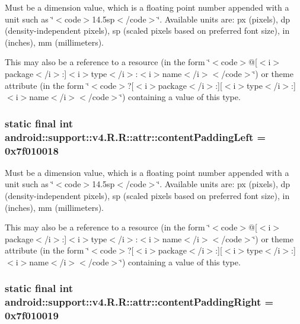 Must be a dimension value, which is a floating point number appended with a unit such as \char`\"{}$<$code$>$14.5sp$<$/code$>$\char`\"{}. Available units are: px (pixels), dp (density-independent pixels), sp (scaled pixels based on preferred font size), in (inches), mm (millimeters). 

This may also be a reference to a resource (in the form \char`\"{}$<$code$>$@\mbox{[}$<$i$>$package$<$/i$>$:\mbox{]}$<$i$>$type$<$/i$>$:$<$i$>$name$<$/i$>$$<$/code$>$\char`\"{}) or theme attribute (in the form \char`\"{}$<$code$>$?\mbox{[}$<$i$>$package$<$/i$>$:\mbox{]}\mbox{[}$<$i$>$type$<$/i$>$:\mbox{]}$<$i$>$name$<$/i$>$$<$/code$>$\char`\"{}) containing a value of this type. \hypertarget{classandroid_1_1support_1_1v4_1_1_r_1_1attr_6cf1c4f10e5e16f428e3e7e74b7709d2}{
\subsubsection[{contentPaddingLeft}]{\setlength{\rightskip}{0pt plus 5cm}static final int android::support::v4.R.R::attr::contentPaddingLeft = 0x7f010018}}
\label{classandroid_1_1support_1_1v4_1_1_r_1_1attr_6cf1c4f10e5e16f428e3e7e74b7709d2}


Must be a dimension value, which is a floating point number appended with a unit such as \char`\"{}$<$code$>$14.5sp$<$/code$>$\char`\"{}. Available units are: px (pixels), dp (density-independent pixels), sp (scaled pixels based on preferred font size), in (inches), mm (millimeters). 

This may also be a reference to a resource (in the form \char`\"{}$<$code$>$@\mbox{[}$<$i$>$package$<$/i$>$:\mbox{]}$<$i$>$type$<$/i$>$:$<$i$>$name$<$/i$>$$<$/code$>$\char`\"{}) or theme attribute (in the form \char`\"{}$<$code$>$?\mbox{[}$<$i$>$package$<$/i$>$:\mbox{]}\mbox{[}$<$i$>$type$<$/i$>$:\mbox{]}$<$i$>$name$<$/i$>$$<$/code$>$\char`\"{}) containing a value of this type. \hypertarget{classandroid_1_1support_1_1v4_1_1_r_1_1attr_e2b10f1fb72497b73461606384d25f86}{
\subsubsection[{contentPaddingRight}]{\setlength{\rightskip}{0pt plus 5cm}static final int android::support::v4.R.R::attr::contentPaddingRight = 0x7f010019}}
\label{classandroid_1_1support_1_1v4_1_1_r_1_1attr_e2b10f1fb72497b73461606384d25f86}


